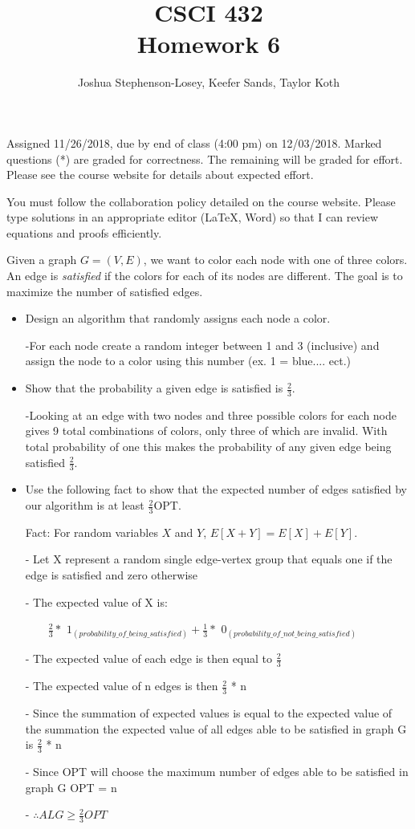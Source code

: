 \documentclass[12pt]{article}
\author{Joshua Stephenson-Losey,
Keefer Sands,
Taylor Koth}
\newenvironment{problem}[2][Problem]
{\begin{trivlist}
\item[\hskip \labelsep {\bfseries #1}\hskip \labelsep {\bfseries #2.}]}{\end{trivlist}}
\begin{document}
 
\title{CSCI 432\\Homework 6}
\date{}
\maketitle

Assigned 11/26/2018, due by end of class (4:00 pm) on 12/03/2018. Marked questions (*) are graded for correctness. The remaining will be graded for effort. Please see the course website for details about expected effort.

You must follow the collaboration policy detailed on the course website. Please type solutions in an appropriate editor (\LaTeX, Word) so that I can review equations and proofs efficiently. 

\begin{problem}{1*}
Given a graph $G=(V,E)$, we want to color each node with one of three colors. An edge is \textit{satisfied} if the colors for each of its nodes are different. The goal is to maximize the number of satisfied edges.

\begin{itemize}
\item Design an algorithm that randomly assigns each node a color.

-For each node create a random integer between 1 and 3 (inclusive) and assign the node to a color using this number (ex. 1 = blue.... ect.)

\item Show that the probability a given edge is satisfied is $\frac{2}{3}$.

-Looking at an edge with two nodes and three possible colors for each node gives 9 total combinations of colors, only three of which are invalid. With total probability of one this makes the probability of any given edge being satisfied $\frac{2}{3}$.

\item Use the following fact to show that the expected number of edges satisfied by our algorithm is at least $\frac{2}{3}$OPT. 

Fact: For random variables $X$ and $Y$, $E[X+Y] = E[X]+E[Y]$.

- Let X represent a random single edge-vertex group that equals one if the edge is satisfied and zero otherwise

- The expected value of X is:

$\qquad\frac{2}{3} *$
$1_{(probability\_of\_being\_satisfied)} + \frac{1}{3} *$
$0_{(probability\_of\_not\_being\_satisfied)}$

- The expected value of each edge is then equal to $\frac{2}{3}$

- The expected value of n edges is then $\frac{2}{3}$ * n

- Since the summation of expected values is equal to the expected value of the summation the expected value of all edges able to be satisfied in graph G is $\frac{2}{3}$ * n

- Since OPT will choose the maximum number of edges able to be satisfied in graph G OPT = n

- $\therefore ALG \ge \frac{2}{3} OPT$
\end{itemize}
\end{problem}
\end{document}
